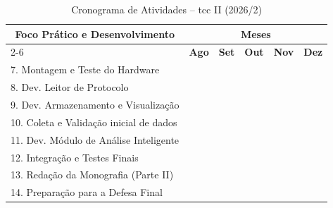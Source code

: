 \documentclass[
	12pt,				%
	openright,			%
	twoside,			%
	a4paper,			%
	english,			%
	brazil				%
	]{abntex2}
\begin{document}
\begin{table}[!htb]
\centering
\caption{Cronograma de Atividades -- \acrshort{tcc} II (2026/2)}
\label{tab:cronograma_tcc2}
\begin{tabular}{|l|c|c|c|c|c|}
\hline
\multicolumn{1}{|c|}{\multirow{2}{*}{\textbf{Foco Prático e Desenvolvimento}}} &
\multicolumn{5}{c|}{\textbf{Meses}} \\ \cline{2-6}
\multicolumn{1}{|c|}{} & \textbf{Ago} & \textbf{Set} & \textbf{Out} & \textbf{Nov}
    & \textbf{Dez} \\ \hline
7. Montagem e Teste do Hardware & \cellcolor[HTML]{C0C0C0} & & & & \\ \hline
8. Dev. Leitor de Protocolo & \cellcolor[HTML]{C0C0C0} & \cellcolor[HTML]{C0C0C0}
    & \cellcolor[HTML]{C0C0C0} & & \\ \hline
9. Dev. Armazenamento e Visualização & & \cellcolor[HTML]{C0C0C0}
    & \cellcolor[HTML]{C0C0C0} & & \\ \hline
10. Coleta e Validação inicial de dados & & \cellcolor[HTML]{C0C0C0}
    & \cellcolor[HTML]{C0C0C0} & & \\ \hline
11. Dev. Módulo de Análise Inteligente & & & \cellcolor[HTML]{C0C0C0}
    & \cellcolor[HTML]{C0C0C0} & \\ \hline
12. Integração e Testes Finais & & & & \cellcolor[HTML]{C0C0C0}
    & \cellcolor[HTML]{C0C0C0} \\ \hline
13. Redação da Monografia (Parte II) & \cellcolor[HTML]{C0C0C0}
    & \cellcolor[HTML]{C0C0C0} & \cellcolor[HTML]{C0C0C0} & \cellcolor[HTML]{C0C0C0}
    & \cellcolor[HTML]{C0C0C0} \\ \hline
14. Preparação para a Defesa Final & & & & &  \cellcolor[HTML]{C0C0C0} \\ \hline
\end{tabular}
\end{table}

\postextual

\end{document}
